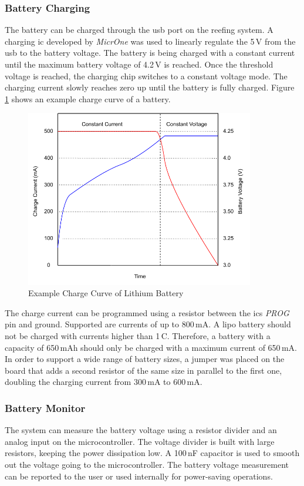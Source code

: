 \subsubsection{Battery Charging}
The battery can be charged through the \acrshort{usb} port on the reefing system. A charging \acrshort{ic} developed by \textit{MicrOne} was used to linearly regulate the 5\,V from the \acrshort{usb} to the battery voltage. The battery is being charged with a constant current until the maximum battery voltage of 4.2\,V is reached. Once the threshold voltage is reached, the charging chip switches to a constant voltage mode. The charging current slowly reaches zero up until the battery is fully charged. Figure \ref{fig:charging-curve} shows an example charge curve of a battery.

\begin{figure}[h!]
	\centering
	\includegraphics[width=10cm]{images/charge-curve}
	\caption{Example Charge Curve of Lithium Battery}
	\label{fig:charging-curve}
\end{figure}

The charge current can be programmed using a resistor between the \acrshort{ic}s \textit{PROG} pin and ground. Supported are currents of up to 800\,mA. A \acrshort{lipo} battery should not be charged with currents higher than 1\,C. Therefore, a battery with a capacity of 650\,mAh should only be charged with a maximum current of 650\,mA. In order to support a wide range of battery sizes, a jumper was placed on the board that adds a second resistor of the same size in parallel to the first one, doubling the charging current from 300\,mA to 600\,mA. 

\subsubsection{Battery Monitor}
The system can measure the battery voltage using a resistor divider and an analog input on the microcontroller. The voltage divider is built with large resistors, keeping the power dissipation low. A 100\,nF capacitor is used to smooth out the voltage going to the microcontroller. The battery voltage measurement can be reported to the user or used internally for power-saving operations.

